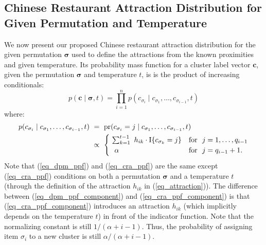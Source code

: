\documentclass[lineno]{biometrika-dbd}
\newcommand{\mass}{\alpha}
\newcommand{\given}{\mid}
\begin{document}
\subsection{Chinese Restaurant Attraction Distribution for Given Permutation and Temperature}
\label{sec_cra_given}

We now present our proposed Chinese restaurant attraction distribution for the
given permutation $\bm{\sigma}$ used to define the attractions from the known
proximities and given temperature.  Its probability mass function for a cluster
label vector $\bm{c}$, given the permutation $\bm{\sigma}$ and temperature $t$,
is is the product of increasing conditionals:
\begin{equation}
\label{eq_cra_ppf}
p(\bm{c} \given \bm{\sigma}, t) = \prod_{i=1}^n p(c_{\sigma_i} \given c_{\sigma_1}, \ldots, c_{\sigma_{i-1}}, t)
\end{equation}
where:
\begin{equation}
\label{eq_cra_ppf_component}
\begin{split}
p(c_{\sigma_i} \given c_{\sigma_1},\ldots,c_{\sigma_{i-1}}, t) 
  & \ = \ \text{pr}(c_{\sigma_i} = j \given c_{\sigma_1},\ldots,c_{\sigma_{i-1}}, t) \\
  & \ \propto \
\begin{cases}
\ \sum_{k=1}^{t-1} \ h_{ik} \cdot \text{I}\{c_{\sigma_k} = j\} & \text{for\
\ } j=1,\ldots,q_{i-1} \\
\ \ \mass & \text{for\ \ } j = q_{i-1} + 1.
\end{cases}
\end{split}
\end{equation}
Note that (\ref{eq_dpm_ppf}) and (\ref{eq_cra_ppf}) are the same except
(\ref{eq_cra_ppf}) conditions on both a permutation $\bm{\sigma}$ and a
temperature $t$ (through the definition of the attraction $h_{ik}$ in
(\ref{eq_attraction})).  The difference between (\ref{eq_dpm_ppf_component})
and (\ref{eq_cra_ppf_component}) is that (\ref{eq_cra_ppf_component})
introduces an attraction $h_{ik}$ (which implicitly depends on the temperature
$t$) in front of the indicator function.  Note that the normalizing constant is
still $1/( \mass + i - 1 )$.  Thus, the probability of assigning item
$\sigma_i$ to a new cluster is still $\mass / ( \mass + i - 1)$.
\end{document}
